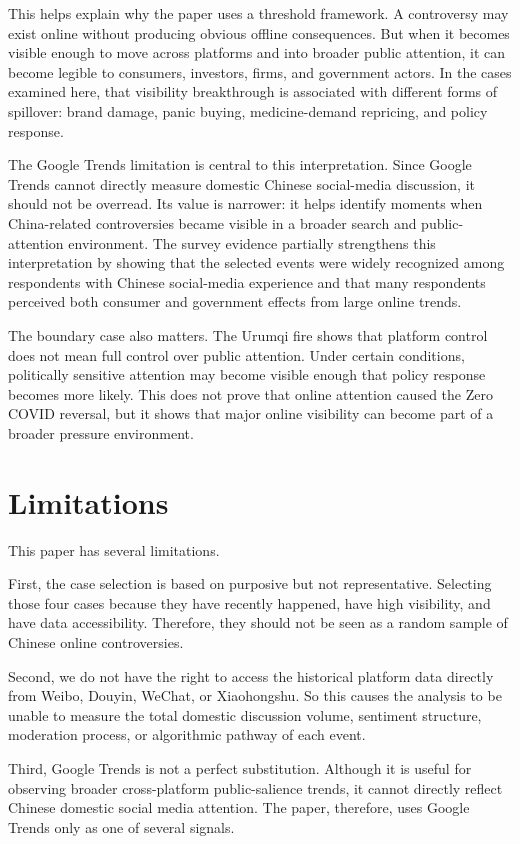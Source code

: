 \documentclass[conference]{IEEEtran}
\begin{document}
This helps explain why the paper uses a threshold framework. A controversy may exist online without producing obvious offline consequences. But when it becomes visible enough to move across platforms and into broader public attention, it can become legible to consumers, investors, firms, and government actors. In the cases examined here, that visibility breakthrough is associated with different forms of spillover: brand damage, panic buying, medicine-demand repricing, and policy response.

The Google Trends limitation is central to this interpretation. Since Google Trends cannot directly measure domestic Chinese social-media discussion, it should not be overread. Its value is narrower: it helps identify moments when China-related controversies became visible in a broader search and public-attention environment. The survey evidence partially strengthens this interpretation by showing that the selected events were widely recognized among respondents with Chinese social-media experience and that many respondents perceived both consumer and government effects from large online trends.

The boundary case also matters. The Urumqi fire shows that platform control does not mean full control over public attention. Under certain conditions, politically sensitive attention may become visible enough that policy response becomes more likely. This does not prove that online attention caused the Zero COVID reversal, but it shows that major online visibility can become part of a broader pressure environment.

\section{Limitations}
This paper has several limitations.

First, the case selection is based on purposive but not representative. Selecting those four cases because they have recently happened, have high visibility, and have data accessibility. Therefore, they should not be seen as a random sample of Chinese online controversies.

Second, we do not have the right to access the historical platform data directly from Weibo, Douyin, WeChat, or Xiaohongshu. So this causes the analysis to be unable to measure the total domestic discussion volume, sentiment structure, moderation process, or algorithmic pathway of each event.

Third, Google Trends is not a perfect substitution. Although it is useful for observing broader cross-platform public-salience trends, it cannot directly reflect Chinese domestic social media attention. The paper, therefore, uses Google Trends only as one of several signals.
\end{document}

